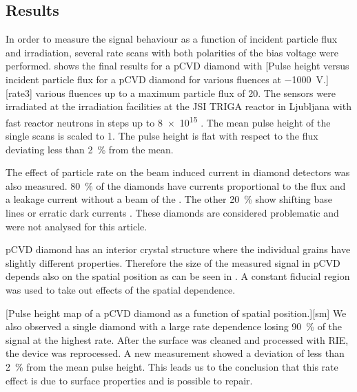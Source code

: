 \subsection{Results}
In order to measure the signal behaviour as a function of incident particle flux and irradiation, several rate scans with both polarities of the bias voltage were performed.  shows the final results for a \ac{pCVD} diamond with 
[Pulse height versus incident particle flux for a \ac{pCVD} diamond for various fluences at \SI{-1000}{\volt}.][rate3]
various fluences up to a maximum particle flux of \SI{20}{\mhzcm}. The sensors were irradiated at the irradiation facilities at the JSI TRIGA reactor in Ljubljana with fast reactor neutrons in steps up to \SI{8e15}{\ncm} \cite{irrad}. The mean pulse height of the single scans is scaled to 1. The pulse height is flat with respect to the flux deviating less than \SI{2}{\%} from the mean.\par 
The effect of particle rate on the beam induced current in diamond detectors was also measured. \SI{80}{\%} of the diamonds have currents proportional to the flux and a leakage current without a beam of the . The other \SI{20}{\%} show shifting base lines or erratic dark currents \cite{erratic}. These diamonds are considered problematic and were not analysed for this article.\par
\ac{pCVD} diamond has an interior crystal structure where the individual grains have slightly different properties. Therefore the size of the measured signal in \ac{pCVD} depends also on the spatial position as can be seen in . A constant fiducial region was used to take out effects of the spatial dependence. \par %
{}[Pulse height map of a \ac{pCVD} diamond as a function of spatial position.][sm]
We also observed a single diamond with a large rate dependence losing \SI{90}{\%} of the signal at the highest rate. After the surface was cleaned and processed with \ac{RIE}, the device was reprocessed. A new measurement showed a deviation of less than \SI{2}{\%} from the mean pulse height. This leads us to the conclusion that this rate effect is due to surface properties and is possible to repair.
